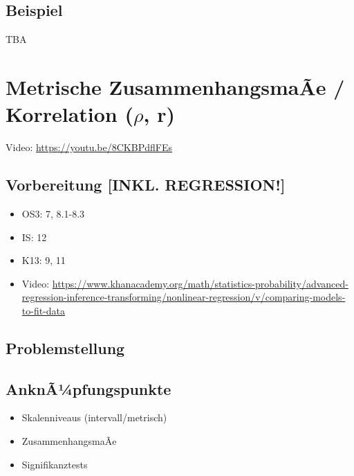 \documentclass[
]{book}
\providecommand{\tightlist}{%
  \setlength{\itemsep}{0pt}\setlength{\parskip}{0pt}}
\begin{document}
\hypertarget{beispiel-2}{%
\section{Beispiel}\label{beispiel-2}}

TBA

\hypertarget{metrische-zusammenhangsmauxe3e-korrelation-rho-r}{%
\chapter{\texorpdfstring{Metrische ZusammenhangsmaÃe / Korrelation (\(\rho\), r)}{Metrische ZusammenhangsmaÃe / Korrelation (\textbackslash rho, r)}}\label{metrische-zusammenhangsmauxe3e-korrelation-rho-r}}

Video: \url{https://youtu.be/8CKBPdflFEs}

\hypertarget{vorbereitung-inkl.-regression}{%
\section{Vorbereitung {[}INKL. REGRESSION!{]}}\label{vorbereitung-inkl.-regression}}

\begin{itemize}
\tightlist
\item
  OS3: 7, 8.1-8.3
\item
  IS: 12
\item
  K13: 9, 11
\item
  Video: \url{https://www.khanacademy.org/math/statistics-probability/advanced-regression-inference-transforming/nonlinear-regression/v/comparing-models-to-fit-data}
\end{itemize}

\hypertarget{problemstellung-6}{%
\section{Problemstellung}\label{problemstellung-6}}

\hypertarget{anknuxe3uxbcpfungspunkte-2}{%
\section{AnknÃ¼pfungspunkte}\label{anknuxe3uxbcpfungspunkte-2}}

\begin{itemize}
\tightlist
\item
  Skalenniveaus (intervall/metrisch)
\item
  ZusammenhangsmaÃe
\item
  Signifikanztests
\end{itemize}
\end{document}
